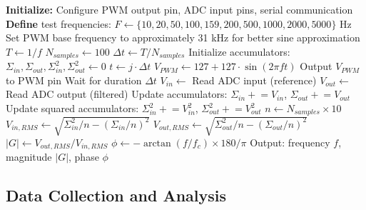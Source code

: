 \begin{algorithm}
\caption{Frequency Response Measurement for RC Filter}
\begin{algorithmic}[1]
\State \textbf{Initialize:} Configure PWM output pin, ADC input pins, serial communication
\State \textbf{Define} test frequencies: $F \gets \{10, 20, 50, 100, 159, 200, 500, 1000, 2000, 5000\}$ Hz
\State Set PWM base frequency to approximately 31 kHz for better sine approximation
\State
{}
    \State $T \gets 1/f$ 
    \State $N_{samples} \gets 100$
    \State $\Delta t \gets T / N_{samples}$
    \State Initialize accumulators: $\Sigma_{in}, \Sigma_{out}, \Sigma_{in}^2, \Sigma_{out}^2 \gets 0$
    \State
            \State $t \gets j \cdot \Delta t$
            \State $V_{PWM} \gets 127 + 127 \cdot \sin(2\pi f t)$ 
            \State Output $V_{PWM}$ to PWM pin
            \State Wait for duration $\Delta t$
            \State $V_{in} \gets$ Read ADC input (reference)
            \State $V_{out} \gets$ Read ADC output (filtered)
            \State Update accumulators: $\Sigma_{in} \mathrel{+}= V_{in}$, $\Sigma_{out} \mathrel{+}= V_{out}$
            \State Update squared accumulators: $\Sigma_{in}^2 \mathrel{+}= V_{in}^2$, $\Sigma_{out}^2 \mathrel{+}= V_{out}^2$
        \EndFor
    \EndFor
    \State
    \State $n \gets N_{samples} \times 10$
    \State $V_{in,RMS} \gets \sqrt{\Sigma_{in}^2/n - (\Sigma_{in}/n)^2}$ 
    \State $V_{out,RMS} \gets \sqrt{\Sigma_{out}^2/n - (\Sigma_{out}/n)^2}$
    \State $|G| \gets V_{out,RMS} / V_{in,RMS}$ 
    \State $\phi \gets -\arctan(f / f_c) \times 180/\pi$ 
    \State Output: frequency $f$, magnitude $|G|$, phase $\phi$
\EndFor
\end{algorithmic}
\end{algorithm}

\subsection{Data Collection and Analysis}

